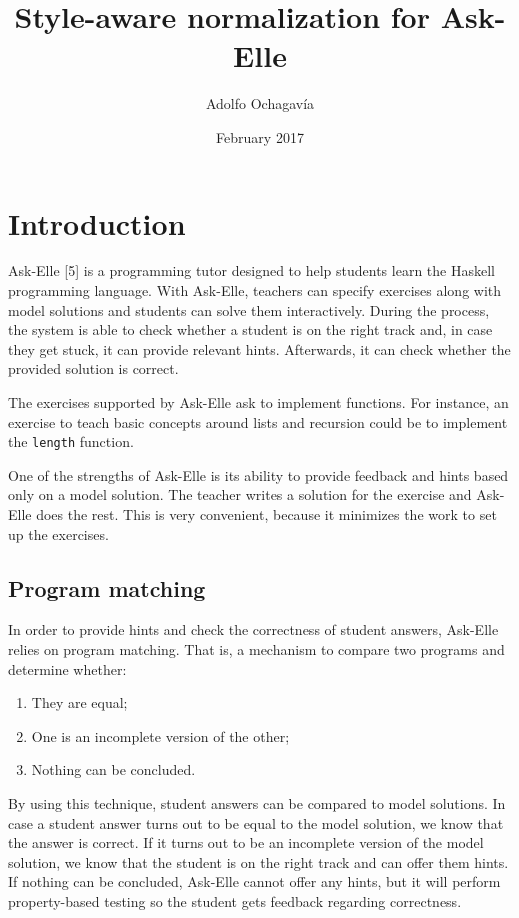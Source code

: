 \documentclass[a4paperpaper,]{report}
\title{Style-aware normalization for Ask-Elle}
\author{Adolfo Ochagavía}
\date{February 2017}
\providecommand{\tightlist}{%
  \setlength{\itemsep}{0pt}\setlength{\parskip}{0pt}}
\begin{document}
\maketitle

\hypertarget{introduction}{%
\chapter{Introduction}\label{introduction}}

Ask-Elle {[}5{]} is a programming tutor designed to help students learn
the Haskell programming language. With Ask-Elle, teachers can specify
exercises along with model solutions and students can solve them
interactively. During the process, the system is able to check whether a
student is on the right track and, in case they get stuck, it can
provide relevant hints. Afterwards, it can check whether the provided
solution is correct.

The exercises supported by Ask-Elle ask to implement functions. For
instance, an exercise to teach basic concepts around lists and recursion
could be to implement the \texttt{length} function.

One of the strengths of Ask-Elle is its ability to provide feedback and
hints based only on a model solution. The teacher writes a solution for
the exercise and Ask-Elle does the rest. This is very convenient,
because it minimizes the work to set up the exercises.

\hypertarget{program-matching}{%
\section{Program matching}\label{program-matching}}

In order to provide hints and check the correctness of student answers,
Ask-Elle relies on program matching. That is, a mechanism to compare two
programs and determine whether:

\begin{enumerate}
\def\labelenumi{\arabic{enumi}.}
\tightlist
\item
  They are equal;
\item
  One is an incomplete version of the other;
\item
  Nothing can be concluded.
\end{enumerate}

By using this technique, student answers can be compared to model
solutions. In case a student answer turns out to be equal to the model
solution, we know that the answer is correct. If it turns out to be an
incomplete version of the model solution, we know that the student is on
the right track and can offer them hints. If nothing can be concluded,
Ask-Elle cannot offer any hints, but it will perform property-based
testing so the student gets feedback regarding correctness.
\end{document}

